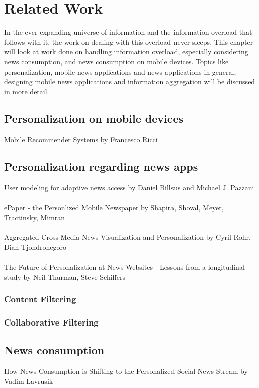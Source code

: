 \chapter{Related Work}
In the ever expanding universe of information and the information overload that follows with it, the work on dealing with this overload never sleeps. This chapter will look at work done on handling information overload, especially considering news consumption, and news consumption on mobile devices. Topics like personalization, mobile news applications and news applications in general, designing mobile news applications and information aggregation will be discussed in more detail.

\section{Personalization on mobile devices}
Mobile Recommender Systems by Francesco Ricci



\section{Personalization regarding news apps}
User modeling for adaptive news access by Daniel Billsus and Michael J. Pazzani
\\\\
ePaper - the Personlized Mobile Newspaper by Shapira, Shoval, Meyer, Tractinsky, Mimran
\\\\
Aggregated Cross-Media News Visualization and Personalization by Cyril Rohr, Dian Tjondronegoro
\\\\
The Future of Personalization at News Websites - Lessons from a longitudinal study by Neil Thurman, Steve Schiffers

\subsection{Content Filtering}

\subsection{Collaborative Filtering	}

\section{News consumption}
How News Consumption is Shifting to the Personalized Social News Stream by Vadim Lavrusik

